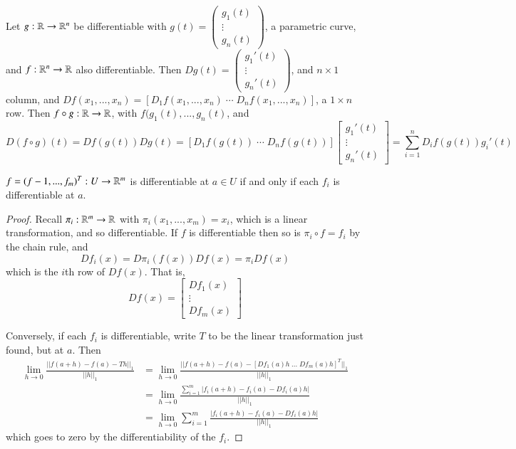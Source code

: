 \begin{example}
    Let $g:\mathbb R\rightarrow \mathbb R^n$ be differentiable with $g(t) = \begin{pmatrix} g_1(t) \\ \vdots \\ g_n(t)\end{pmatrix}$, a parametric curve, and $f:\mathbb R^n\rightarrow \mathbb R$ also differentiable. Then $Dg(t) = \begin{pmatrix} g_1'(t) \\ \vdots \\ g_n'(t)\end{pmatrix}$, and $n\times 1$ column, and $Df(x_1,...,x_n) = \left[D_1f(x_1,...,x_n)\;\cdots \; D_nf(x_1,...,x_n)\right]$, a $1\times n$ row. Then $f\circ g:\mathbb R\rightarrow \mathbb R$, with $f(g_1(t),...,g_n(t)$, and $$D(f\circ g)(t) = Df(g(t))Dg(t) = \left[D_1f(g(t))\;\cdots \; D_nf(g(t))\right] \begin{bmatrix} g_1'(t) \\ \vdots \\ g_n'(t) \end{bmatrix} = \sum_{i=1}^nD_if(g(t))g_i'(t)$$
\end{example}

\begin{proposition}
    $f = (f-1,...,f_m)^T:U\rightarrow \mathbb R^m$ is differentiable at $a \in U$ if and only if each $f_i$ is differentiable at $a$.
\end{proposition}
\begin{proof}
    Recall $\pi_i:\mathbb R^m\rightarrow \mathbb R$ with $\pi_i(x_1,...,x_m) = x_i$, which is a linear transformation, and so differentiable. If $f$ is differentiable then so is $\pi_i \circ f = f_i$ by the chain rule, and $$Df_i(x) = D\pi_i(f(x))Df(x) = \pi_i Df(x)$$ which is the $i$th row of $Df(x)$. That is, $$Df(x) = \begin{bmatrix} Df_1(x) \\ \vdots \\ Df_m(x) \end{bmatrix}$$

    Conversely, if each $f_i$ is differentiable, write $T$ to be the linear transformation just found, but at $a$. Then \begin{align*}
        \lim\limits_{h\rightarrow 0}\frac{||f(a+h) - f(a) - Th||_1}{||h||_1} &= \lim\limits_{h\rightarrow 0}\frac{||f(a+h) - f(a) - [Df_1(a)h\;...\;Df_m(a)h]^T||_1}{||h||_1} \\
        &= \lim\limits_{h\rightarrow 0}\frac{\sum_{i=1}^m|f_i(a+h)-f_i(a)-Df_i(a)h|}{||h||_1} \\
        &= \lim\limits_{h\rightarrow 0}\sum_{i=1}^m\frac{|f_i(a+h) - f_i(a) - Df_i(a)h|}{||h||_1}
    \end{align*}
    which goes to zero by the differentiability of the $f_i$.
\end{proof}


